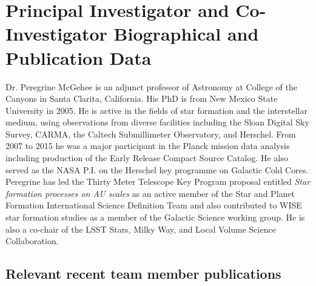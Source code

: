 \documentclass[11pt]{amsart}
\begin{document}
\section{Principal Investigator and Co-Investigator Biographical and
Publication Data}

Dr. Peregrine McGehee is an adjunct professor of Astronomy at College of the Canyons in Santa Clarita, California. His PhD is from New Mexico State University in 2005. He is active
in the fields of star formation and the interstellar medium, using observations from diverse facilities including the Sloan Digital Sky Survey, CARMA, 
the Caltech Submillimeter Observatory, and Herschel.
From 2007 to 2015 he was a major participant in the Planck mission data analysis including production of the Early Release Compact Source Catalog. 
He also served as the NASA P.I. on the Herschel key programme on Galactic Cold Cores.   
Peregrine has led the Thirty Meter Telescope Key Program proposal entitled {\it Star formation processes on AU scales} as an active member of the Star and Planet Formation International Science Definition Team and also contributed to WISE star formation studies as a member of the Galactic Science working group.
He is also a co-chair of the LSST Stars, Milky Way, and Local Volume Science Collaboration.

\subsection{Relevant recent team member publications} 
\end{document}

